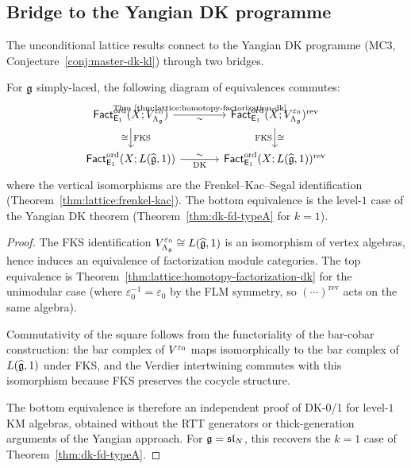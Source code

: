 \subsection{Bridge to the Yangian DK programme}

The unconditional lattice results connect to the Yangian DK
programme (MC3, Conjecture~\ref{conj:master-dk-kl}) through
two bridges.

\begin{proposition}
\label{prop:lattice:yangian-bridge-level1}
For $\mathfrak{g}$ simply-laced, the following diagram of equivalences
commutes:
\begin{equation}\label{eq:lattice:yangian-bridge}
\begin{tikzcd}[column sep=3.5em]
\Factord(X; \Vlat_{\Lambda_\fg}^{\varepsilon_0})
  \ar[r, "\sim"', "\text{Thm~\ref{thm:lattice:homotopy-factorization-dk}}"]
  \ar[d, "\cong"', "\text{FKS}"]
& \Factord(X; \Vlat_{\Lambda_\fg}^{\varepsilon_0})^{\mathrm{rev}}
  \ar[d, "\cong", "\text{FKS}"'] \\
\Factord(X; L(\AffKM{g}, 1))
  \ar[r, "\sim", "\text{DK}"']
& \Factord(X; L(\AffKM{g}, 1))^{\mathrm{rev}}
\end{tikzcd}
\end{equation}
where the vertical isomorphisms are the Frenkel--Kac--Segal
identification
\textup{(}Theorem~\textup{\ref{thm:lattice:frenkel-kac})}.
The bottom equivalence is the level-$1$ case of the Yangian DK
theorem \textup{(}Theorem~\textup{\ref{thm:dk-fd-typeA}} for
$k = 1$\textup{)}.
\end{proposition}

\begin{proof}
The FKS identification $V_{\Lambda_{\mathfrak{g}}}^{\varepsilon_0}
\cong L(\widehat{\mathfrak{g}}, 1)$ is an isomorphism of vertex algebras,
hence induces an equivalence of factorization module categories.
The top equivalence is
Theorem~\ref{thm:lattice:homotopy-factorization-dk} for the
unimodular case (where $\varepsilon_0^{-1} = \varepsilon_0$
by the FLM symmetry, so $(\cdots)^{\mathrm{rev}}$ acts on the
same algebra).

Commutativity of the square follows from the functoriality of the
bar-cobar construction: the bar complex of $V^{\varepsilon_0}$
maps isomorphically to the bar complex of $L(\widehat{\mathfrak{g}}, 1)$ under
FKS, and the Verdier intertwining commutes with this isomorphism
because FKS preserves the cocycle structure.

The bottom equivalence is therefore an independent proof of
DK-0/1 for level-$1$ KM algebras, obtained without the RTT
generators or thick-generation arguments of the Yangian approach.
For $\mathfrak{g} = \mathfrak{sl}_N$, this recovers the $k = 1$ case of
Theorem~\ref{thm:dk-fd-typeA}.
\end{proof}


